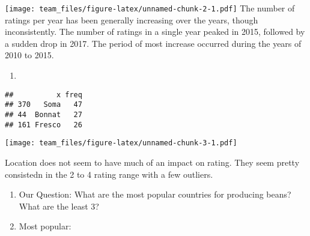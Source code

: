 \documentclass[]{article}
\newenvironment{Shaded}{\begin{snugshade}}{\end{snugshade}}
\newcommand{\DataTypeTok}[1]{\textcolor[rgb]{0.13,0.29,0.53}{#1}}
\newcommand{\DecValTok}[1]{\textcolor[rgb]{0.00,0.00,0.81}{#1}}
\newcommand{\KeywordTok}[1]{\textcolor[rgb]{0.13,0.29,0.53}{\textbf{#1}}}
\newcommand{\NormalTok}[1]{#1}
\newcommand{\OperatorTok}[1]{\textcolor[rgb]{0.81,0.36,0.00}{\textbf{#1}}}
\newcommand{\StringTok}[1]{\textcolor[rgb]{0.31,0.60,0.02}{#1}}
\begin{document}
\texttt{[image: team\_files/figure-latex/unnamed-chunk-2-1.pdf]} The
number of ratings per year has been generally increasing over the years,
though inconsistently. The number of ratings in a single year peaked in
2015, followed by a sudden drop in 2017. The period of most increase
occurred during the years of 2010 to 2015.

\begin{enumerate}
\def\labelenumi{\arabic{enumi})}
\setcounter{enumi}{2}
\item
\end{enumerate}

\begin{Shaded}
\end{Shaded}

\begin{verbatim}
##          x freq
## 370   Soma   47
## 44  Bonnat   27
## 161 Fresco   26
\end{verbatim}

\begin{Shaded}
\end{Shaded}

\texttt{[image: team\_files/figure-latex/unnamed-chunk-3-1.pdf]}

Location does not seem to have much of an impact on rating. They seem
pretty consistedn in the 2 to 4 rating range with a few outliers.

\begin{enumerate}
\def\labelenumi{\arabic{enumi})}
\setcounter{enumi}{3}
\item
  Our Question: What are the most popular countries for producing beans?
  What are the least 3?
\item
  Most popular:
\end{enumerate}
\end{document}
